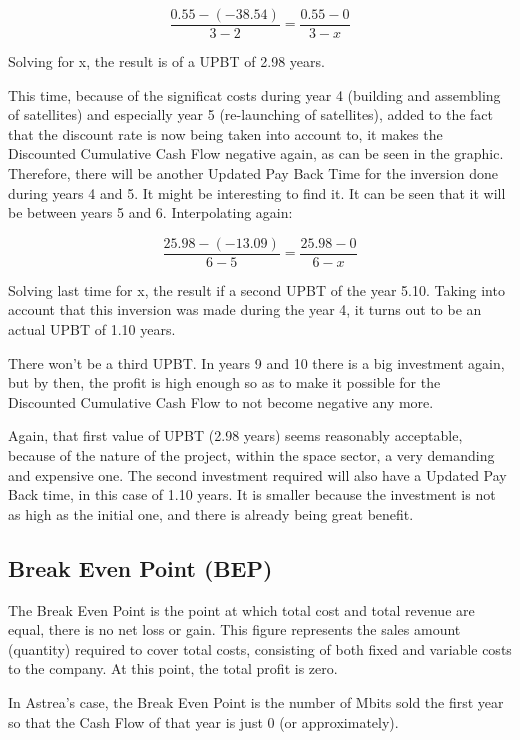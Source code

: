 \begin{equation}
\frac{0.55-(-38.54)}{3-2}=\frac{0.55-0}{3-x}
\end{equation}

Solving for x, the result is of a UPBT of 2.98 years.

This time, because of the significat costs during year 4 (building and assembling of satellites) and especially year 5 (re-launching of satellites), added to the fact that the discount rate is now being taken into account to, it makes the Discounted Cumulative Cash Flow negative again, as can be seen in the graphic. Therefore, there will be another Updated Pay Back Time for the inversion done during years 4 and 5. It might be interesting to find it. It can be seen that it will be between years 5 and 6. Interpolating again:

\begin{equation}
\frac{25.98-(-13.09)}{6-5}=\frac{25.98-0}{6-x}
\end{equation}

Solving last time for x, the result if a second UPBT of the year 5.10. Taking into account that this inversion was made during the year 4, it turns out to be an actual UPBT of 1.10 years.

There won't be a third UPBT. In years 9 and 10 there is a big investment again, but by then, the profit is high enough so as to make it possible for the Discounted Cumulative Cash Flow to not become negative any more. 

Again, that first value of UPBT (2.98 years) seems reasonably acceptable, because of the nature of the project, within the space sector, a very demanding and expensive one. The second investment required will also have a Updated Pay Back time, in this case of 1.10 years. It is smaller because the investment is not as high as the initial one, and there is already being great benefit. 

\subsection{Break Even Point (BEP)}
The Break Even Point is the point at which total cost and total revenue are equal, there is no net loss or gain. This figure represents the sales amount (quantity) required to cover total costs, consisting of both fixed and variable costs to the company. At this point, the total profit is zero. 

In Astrea's case, the Break Even Point is the number of Mbits sold the first year so that the Cash Flow of that year is just 0 (or approximately). 

